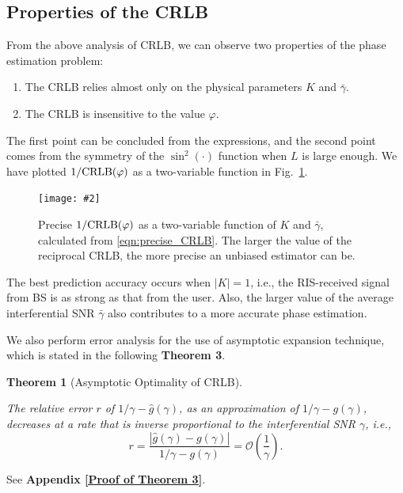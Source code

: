 \documentclass[journal,twocolumn]{IEEEtran}
\newtheorem{theorem}{\bf Theorem}
\theoremstyle{nonumberplain}
\newcommand{\myincludegraphics}[2][width=1\linewidth]{\texttt{[image: \#2]}}
\newcommand{\myincludegraphics}[2][width=0.8\linewidth]{\texttt{[image: \#2]}}
\begin{document}
\subsection{Properties of the CRLB} \label{Properties of the CRLB}
    From the above analysis of CRLB, we can observe two properties of the phase estimation problem:
    \begin{enumerate}
        \item The CRLB relies almost only on the physical parameters $K$ and $\bar{\gamma}$.
        \item The CRLB is insensitive to the value $\varphi$.
    \end{enumerate}
    The first point can be concluded from the expressions, and the second point comes from the symmetry of the $\sin^2(\cdot)$ function when $L$ is large enough. 
    We have plotted $1/{\rm CRLB}(\varphi)$ as a two-variable function in Fig.~\ref{fig:CRLB two variable}. 
    \begin{figure}[!t]
        \centering
        \myincludegraphics{data/CRLB.pdf}
        \caption{Precise $1/{\rm CRLB}(\varphi)$ as a two-variable function of $K$ and $\bar{\gamma}$, calculated from \eqref{eqn:precise_CRLB}. The larger the value of the reciprocal CRLB, the more precise an unbiased estimator can be. }
        \label{fig:CRLB two variable}
    \end{figure}
    The best prediction accuracy occurs when $\lvert K \rvert = 1$, i.e., the RIS-received signal from BS is as strong as that from the user. 
    Also, the larger value of the average interferential SNR $\bar{\gamma}$ also contributes to a more accurate phase estimation. 

We also perform error analysis for the use of asymptotic expansion technique, which is stated in the following {\bf Theorem 3}. 

    \begin{theorem}[Asymptotic Optimality of CRLB] \label{thm_error_analysis}\mbox{}\par
        The relative error $r$ of $1/\gamma - \hat{g}(\gamma)$, as an approximation of $1/\gamma - g(\gamma)$, decreases at a rate that is inverse proportional to the interferential SNR $\gamma$, i.e.,
        \begin{equation}
            r=\frac{\left|\hat{g}(\gamma)-g(\gamma)\right|}{1/\gamma - g(\gamma)} = \mathcal{O}\left(\frac{1}{\gamma}\right).
        \end{equation}
    \end{theorem}
    \begin{IEEEproof}
        See {\bf Appendix \ref{Proof of Theorem 3}}. 
    \end{IEEEproof}
\end{document}

